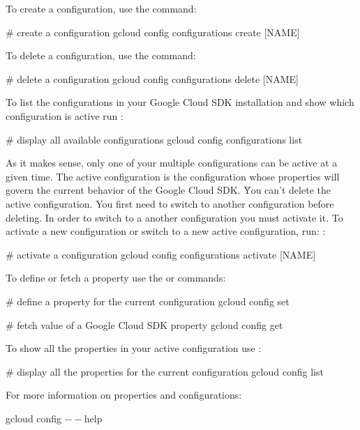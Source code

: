 To create a configuration, use the  command:
\begin{bash}
# create a configuration
gcloud config configurations create [NAME]
\end{bash}

To delete a configuration, use the  command:
\begin{bash}
# delete a configuration
gcloud config configurations delete [NAME]
\end{bash}

To list the configurations in your Google Cloud SDK installation and show which configuration is active run :
\begin{bash}
# display all available configurations
gcloud config configurations list
\end{bash}

As it makes sense, only one of your multiple configurations can be active at a given time. The active configuration
is the configuration whose properties will govern the current behavior of the Google Cloud SDK. \v

You can't delete the active configuration. You first need to switch to another configuration before deleting. In
order to switch to a another configuration you must activate it. To activate a new configuration or switch to a new
active configuration, run: :
\begin{bash}
# activate a configuration
gcloud config configurations activate [NAME]
\end{bash}

To define or fetch a property use the  or  commands:
\begin{bash}
# define a property for the current configuration
gcloud config set
\end{bash}

\begin{bash}
# fetch value of a Google Cloud SDK property
gcloud config get
\end{bash}

To show all the properties in your active configuration use :
\begin{bash}
# display all the properties for the current configuration
gcloud config list
\end{bash}

For more information on properties and configurations:
\begin{bash}
gcloud config $--$help
\end{bash}

